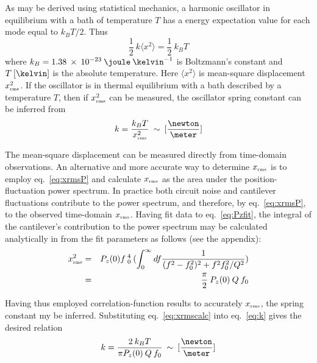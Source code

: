 As may be derived using statistical mechanics, a harmonic oscillator
in equilibrium with a bath of temperature $T$ has a energy expectation
value for each mode equal to $k_B T/2$.  Thus
\begin{equation}
\frac{1}{2} \: k \langle x^2 \rangle = \frac{1}{2} \: k_B T
\label{eq:equip}
\end{equation}
where $k_B = 1.38 \: \times \: {10}^{-23} \: \joule \: {\kelvin}^{-1}$
is Boltzmann's constant and $T \: [\kelvin]$ is the absolute
temperature.  Here $\langle x^2 \rangle$ is mean-square displacement $x_{\mbox{\tiny rms}}^2$.  If the
oscillator is in thermal equilibrium with a bath described by a
temperature $T$, then if $x_{\mbox{\tiny rms}}^2$ can be measured, the
oscillator spring constant can be inferred from
\begin{equation}
k = \frac{k_B T}{x_{\mbox{\tiny rms}}^2} \: \sim \: [\frac{\newton}{\meter}]
\label{eq:k}
\end{equation}

The mean-square displacement can be measured directly from time-domain
observations.  An alternative and more accurate way to determine
$x_{\mbox{\tiny rms}}$ is to employ eq.~\ref{eq:xrmsP} and calculate $x_{\mbox{\tiny rms}}$ as the
area under the position-fluctuation power spectrum.  In practice both circuit
noise and cantilever fluctuations contribute to the power spectrum,
and therefore, by eq.~\ref{eq:xrmsP}, to the observed time-domain
$x_{\mbox{\tiny rms}}$. Having fit data to eq.~\ref{eq:Pzfit}, the integral of the
cantilever's contribution to the power spectrum may be calculated
analytically in from the fit parameters as follows (see the
appendix):
\begin{eqnarray}
x_{\mbox{\tiny rms}}^2 & = & P_z(0) f\: _0^4 \: (\int_{0}^{\infty} df \frac{1}{(f^2 - f_0^2)^2 + f^2 f_0^2 / Q^2}) \nonumber \\
        & = & \frac{\pi}{2} \: P_z (0) \: Q \: f_0 \label{eq:xrmscalc}
\end{eqnarray}

Having thus employed correlation-function results to accurately
$x_{\mbox{\tiny rms}}$, the spring constant my be inferred.  Substituting
eq.~\ref{eq:xrmscalc} into eq.~\ref{eq:k} gives the desired relation
\begin{equation}
k = \frac{2 \: k_B T}{\pi P_z(0) \: Q \: f_0} \: \sim \: [\frac{\newton}{\meter}]
\label{eq:k2}
\end{equation}



\label{sect:minimum-detectable-force}

